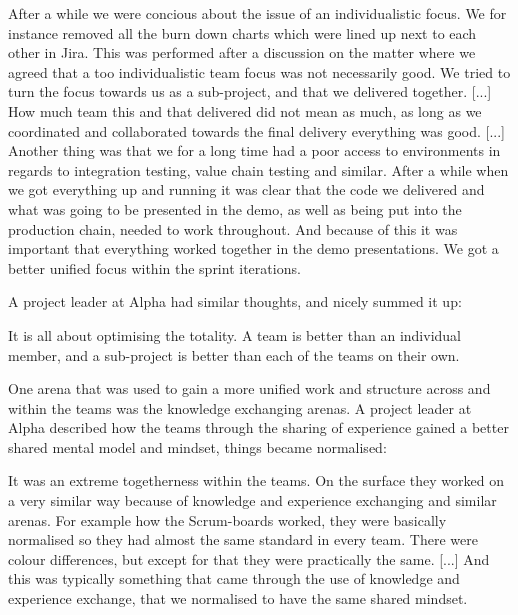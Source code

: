 \begin{fancyquotes}
After a while we were concious about the issue of an individualistic focus. We for instance removed all the burn down charts which were lined up next to each other in Jira. This was performed after a discussion on the matter where we agreed that a too individualistic team focus was not necessarily good. We tried to turn the focus towards us as a sub-project, and that we delivered together. [...] How much team this and that delivered did not mean as much, as long as we coordinated and collaborated towards the final delivery everything was good. [...] Another thing was that we for a long time had a poor access to environments in regards to integration testing, value chain testing and similar. After a while when we got everything up and running it was clear that the code we delivered and what was going to be presented in the demo, as well as being put into the production chain, needed to work throughout. And because of this it was important that everything worked together in the demo presentations. We got a better unified focus within the sprint iterations.
\end{fancyquotes}

A project leader at Alpha had similar thoughts, and nicely summed it up:

\begin{fancyquotes}
It is all about optimising the totality. A team is better than an individual member, and a sub-project is better than each of the teams on their own.
\end{fancyquotes}

One arena that was used to gain a more unified work and structure across and within the teams was the knowledge exchanging arenas. A project leader at Alpha described how the teams through the sharing of experience gained a better shared mental model and mindset, things became normalised:

\begin{fancyquotes}
It was an extreme togetherness within the teams. On the surface they worked on a very similar way because of knowledge and experience exchanging and similar arenas. For example how the Scrum-boards worked, they were basically normalised so they had almost the same standard in every team. There were colour differences, but except for that they were practically the same. [...] And this was typically something that came through the use of knowledge and experience exchange, that we normalised to have the same shared mindset.
\end{fancyquotes}

